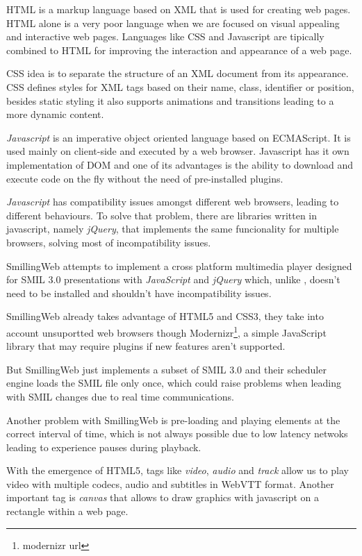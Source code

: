   \ac{HTML} is a markup language based on \ac{XML} that is used for creating web pages. \ac{HTML} alone is a very poor language when we are focused on visual appealing and interactive web pages. Languages like \ac{CSS} and Javascript are tipically combined to \ac{HTML} for improving the interaction and appearance of a web page. 

  \ac{CSS} idea is to separate the structure of an \ac{XML} document from its appearance. \ac{CSS} defines styles for \ac{XML} tags based on their name, class, identifier or position, besides static styling it also supports animations and transitions leading to a more dynamic content.

  \textit{Javascript} is an imperative object oriented language based on ECMAScript. It is used mainly on client-side and executed by a web browser. Javascript has it own implementation of \ac{DOM} and one of its advantages is the ability to download and execute code on the fly without the need of pre-installed plugins.

  \textit{Javascript} has compatibility issues amongst different web browsers, leading to different behaviours. To solve that problem, there are libraries written in javascript, namely \textit{jQuery}, that implements the same funcionality for multiple browsers, solving most of incompatibility issues.

  SmillingWeb \cite{smillingweb} attempts to implement a cross platform multimedia player designed for \ac{SMIL} 3.0 presentations with \textit{JavaScript} and \textit{jQuery} which, unlike \cite{ambulant}, doesn't need to be installed and shouldn't have incompatibility issues. 

  SmillingWeb already takes advantage of \ac{HTML}5 and \ac{CSS}3, they take into account unsuportted web browsers though Modernizr\footnote{modernizr url}, a simple JavaScript library that may require plugins if new features aren't supported.  

  But SmillingWeb just implements a subset of \ac{SMIL} 3.0 and their scheduler engine loads the \ac{SMIL} file only once, which could raise problems when leading with \ac{SMIL} changes due to real time communications.

  Another problem with SmillingWeb is pre-loading and playing elements at the correct interval of time, which is not always possible due to low latency netwoks leading to experience pauses during playback.

  With the emergence of \ac{HTML}5, tags like \textit{video}, \textit{audio} and \textit{track} allow us to play video with multiple codecs, audio and subtitles in \ac{WebVTT} format. Another important tag is \textit{canvas} that allows to draw graphics with javascript on a rectangle within a web page.

